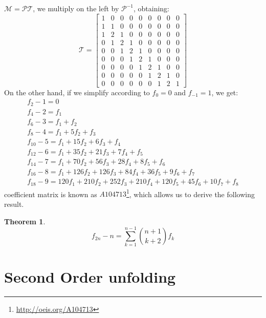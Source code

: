 \documentclass[a4paper,dottedtoc,headinclude,footinclude]{report} %
\theoremstyle{plain}
\newtheorem{thm}{Theorem}[section]
\begin{document}
        $\mathcal{M}=\mathcal{P}\mathcal{T}$, we multiply on the left
        by $\mathcal{P}^{-1}$, obtaining:
    \begin{displaymath}
        \mathcal{T} = \left[\begin{array}{ccccccccc}
            1 & 0 & 0 & 0 & 0 & 0 & 0 & 0 & 0\\
            1 & 1 & 0 & 0 & 0 & 0 & 0 & 0 & 0\\
            1 & 2 & 1 & 0 & 0 & 0 & 0 & 0 & 0\\
            0 & 1 & 2 & 1 & 0 & 0 & 0 & 0 & 0\\
            0 & 0 & 1 & 2 & 1 & 0 & 0 & 0 & 0\\
            0 & 0 & 0 & 1 & 2 & 1 & 0 & 0 & 0\\
            0 & 0 & 0 & 0 & 1 & 2 & 1 & 0 & 0\\
            0 & 0 & 0 & 0 & 0 & 1 & 2 & 1 & 0\\
            0 & 0 & 0 & 0 & 0 & 0 & 1 & 2 & 1
            \end{array}\right]
    \end{displaymath}
    On the other hand, if we simplify according to $f_{0}=0$ and
    $f_{-1}=1$, we get:
    \begin{displaymath}
        \begin{array}{c}
            f_{2} - 1=0\\
            f_{4} - 2=f_{1}\\
            f_{6} - 3=f_{1} + f_{2}\\
            f_{8} - 4=f_{1} + 5 f_{2} + f_{3}\\
            f_{10} - 5=f_{1} + 15 f_{2} + 6 f_{3} + f_{4}\\
            f_{12} - 6=f_{1} + 35 f_{2} + 21 f_{3} + 7 f_{4} + f_{5}\\
            f_{14} - 7=f_{1} + 70 f_{2} + 56 f_{3} + 28 f_{4} + 8 f_{5} + f_{6}\\
            f_{16} - 8=f_{1} + 126 f_{2} + 126 f_{3} + 84 f_{4} + 36 f_{5} + 9 f_{6} + f_{7}\\
            f_{18} - 9 = 120 f_{1} + 210 f_{2} + 252 f_{3} + 210 f_{4} + 120 f_{5} + 45 f_{6} + 10 f_{7} + f_{8}
            \end{array}
    \end{displaymath}
    coefficient matrix is known as $A104713$\footnote{\url{http://oeis.org/A104713}},
    which allows us to derive the following result.

    \begin{thm}
        \begin{displaymath}
            f_{2n} - n = \sum_{k=1}^{n-1}{{{n+1}\choose{k+2}}f_{k}}
        \end{displaymath}
    \end{thm}

    \section{Second Order unfolding}
    \lipsum[1]

\end{document}
